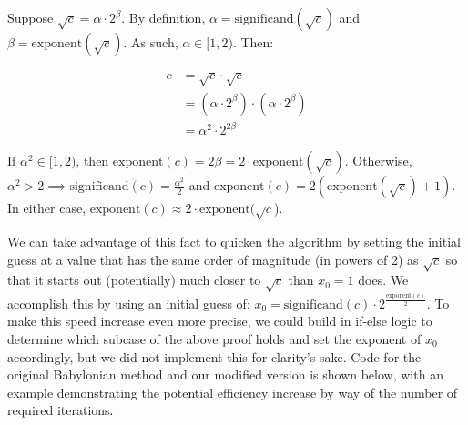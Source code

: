 \documentclass{article}
\begin{document}
Suppose $\sqrt{c} = \alpha \cdot 2^{\beta}$. By definition, $\alpha = \text{significand}(\sqrt{c})$ and $\beta = \text{exponent}(\sqrt{c})$. As such, $\alpha \in [1,2)$. Then:

\begin{align*}
c &= \sqrt{c} \cdot \sqrt{c} \\
&= (\alpha \cdot 2^{\beta}) \cdot (\alpha \cdot 2^{\beta}) \\
&= \alpha^2 \cdot 2^{2\beta}
\end{align*}

If $\alpha^2 \in [1,2)$, then $\text{exponent}(c) = 2\beta = 2 \cdot \text{exponent}(\sqrt{c})$. Otherwise, $\alpha^2 > 2 \implies \text{significand}(c) = \frac{\alpha^2}{2}$ and $\text{exponent}(c) = 2(\text{exponent}(\sqrt{c}) + 1)$. In either case, $\text{exponent}(c) \approx 2 \cdot \text{exponent}(\sqrt{c}$).

We can take advantage of this fact to quicken the algorithm by setting the initial guess at a value that has the same order of magnitude (in powers of 2) as $\sqrt{c}$ so that it starts out (potentially) much closer to $\sqrt{c}$ than $x_0 = 1$ does. We accomplish this by using an initial guess of: $x_0 = \text{significand}(c) \cdot 2^{\frac{\text{exponent}(c)}{2}}$. To make this speed increase even more precise, we could build in if-else logic to determine which subcase of the above proof holds and set the exponent of $x_0$ accordingly, but we did not implement this for clarity's sake. Code for the original Babylonian method and our modified version is shown below, with an example demonstrating the potential efficiency increase by way of the number of required iterations.
\end{document}
